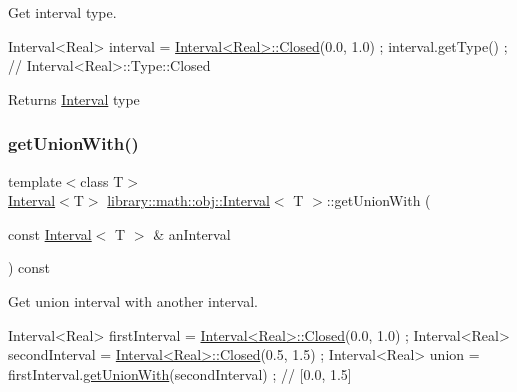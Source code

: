 Get interval type. 


\begin{DoxyCode}
Interval<Real> interval = \hyperlink{classlibrary_1_1math_1_1obj_1_1_interval_aae8bb2b89af450729338d48563def4d7}{Interval<Real>::Closed}(0.0, 1.0) ;
interval.getType() ; \textcolor{comment}{// Interval<Real>::Type::Closed}
\end{DoxyCode}


\begin{DoxyReturn}{Returns}
\hyperlink{classlibrary_1_1math_1_1obj_1_1_interval}{Interval} type 
\end{DoxyReturn}
\mbox{\label{classlibrary_1_1math_1_1obj_1_1_interval_a4183db388b6a63429a031d3687b20ecf}} 
\subsubsection{\texorpdfstring{get\+Union\+With()}{getUnionWith()}}
{\footnotesize\ttfamily template$<$class T$>$ \\
\hyperlink{classlibrary_1_1math_1_1obj_1_1_interval}{Interval}$<$T$>$ \hyperlink{classlibrary_1_1math_1_1obj_1_1_interval}{library\+::math\+::obj\+::\+Interval}$<$ T $>$\+::get\+Union\+With (\begin{DoxyParamCaption}\item[{const \hyperlink{classlibrary_1_1math_1_1obj_1_1_interval}{Interval}$<$ T $>$ \&}]{an\+Interval }\end{DoxyParamCaption}) const}



Get union interval with another interval. 


\begin{DoxyCode}
Interval<Real> firstInterval = \hyperlink{classlibrary_1_1math_1_1obj_1_1_interval_aae8bb2b89af450729338d48563def4d7}{Interval<Real>::Closed}(0.0, 1.0) ;
Interval<Real> secondInterval = \hyperlink{classlibrary_1_1math_1_1obj_1_1_interval_aae8bb2b89af450729338d48563def4d7}{Interval<Real>::Closed}(0.5, 1.5) ;
Interval<Real> \textcolor{keyword}{union }= firstInterval.\hyperlink{classlibrary_1_1math_1_1obj_1_1_interval_a4183db388b6a63429a031d3687b20ecf}{getUnionWith}(secondInterval) ; \textcolor{comment}{// [0.0, 1.5]}
\end{DoxyCode}




